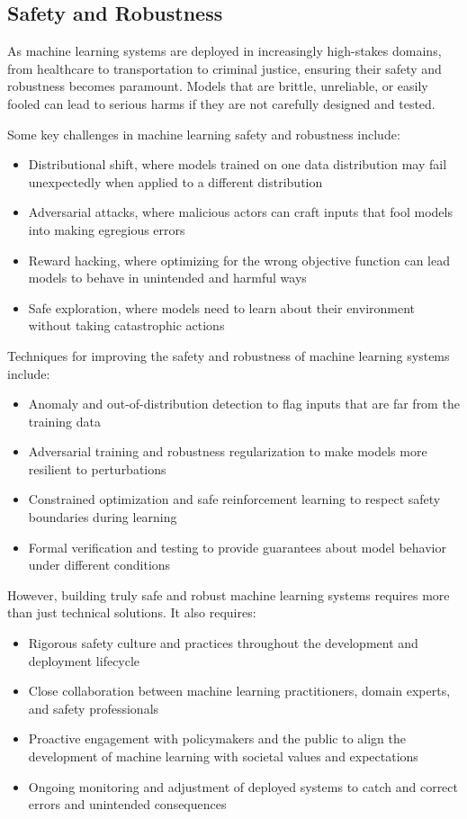 \documentclass[
  9pt,
  letterpaper,
  abstract,
  titlepage]{scrbook}
\begin{document}
\subsection{Safety and Robustness}\label{safety-and-robustness}

As machine learning systems are deployed in increasingly high-stakes
domains, from healthcare to transportation to criminal justice, ensuring
their safety and robustness becomes paramount. Models that are brittle,
unreliable, or easily fooled can lead to serious harms if they are not
carefully designed and tested.

Some key challenges in machine learning safety and robustness include:

\begin{itemize}
\item
  Distributional shift, where models trained on one data distribution
  may fail unexpectedly when applied to a different distribution
\item
  Adversarial attacks, where malicious actors can craft inputs that fool
  models into making egregious errors
\item
  Reward hacking, where optimizing for the wrong objective function can
  lead models to behave in unintended and harmful ways
\item
  Safe exploration, where models need to learn about their environment
  without taking catastrophic actions
\end{itemize}

Techniques for improving the safety and robustness of machine learning
systems include:

\begin{itemize}
\item
  Anomaly and out-of-distribution detection to flag inputs that are far
  from the training data
\item
  Adversarial training and robustness regularization to make models more
  resilient to perturbations
\item
  Constrained optimization and safe reinforcement learning to respect
  safety boundaries during learning
\item
  Formal verification and testing to provide guarantees about model
  behavior under different conditions
\end{itemize}

However, building truly safe and robust machine learning systems
requires more than just technical solutions. It also requires:

\begin{itemize}
\item
  Rigorous safety culture and practices throughout the development and
  deployment lifecycle
\item
  Close collaboration between machine learning practitioners, domain
  experts, and safety professionals
\item
  Proactive engagement with policymakers and the public to align the
  development of machine learning with societal values and expectations
\item
  Ongoing monitoring and adjustment of deployed systems to catch and
  correct errors and unintended consequences
\end{itemize}
\end{document}
